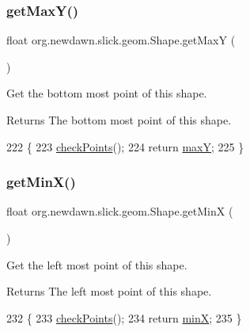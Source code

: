 \subsubsection{\texorpdfstring{get\+Max\+Y()}{getMaxY()}}
{\footnotesize\ttfamily float org.\+newdawn.\+slick.\+geom.\+Shape.\+get\+MaxY (\begin{DoxyParamCaption}{ }\end{DoxyParamCaption})\hspace{0.3cm}{\ttfamily [inline]}}

Get the bottom most point of this shape.

\begin{DoxyReturn}{Returns}
The bottom most point of this shape. 
\end{DoxyReturn}

\begin{DoxyCode}
222                            \{
223         \mbox{\hyperlink{classorg_1_1newdawn_1_1slick_1_1geom_1_1_shape_a84293802d05e8666a441720bfc12745d}{checkPoints}}();
224         \textcolor{keywordflow}{return} \mbox{\hyperlink{classorg_1_1newdawn_1_1slick_1_1geom_1_1_shape_aaacbabfb1b7d0653f59658d92ded1c2b}{maxY}};
225     \}
\end{DoxyCode}
\mbox{\label{classorg_1_1newdawn_1_1slick_1_1geom_1_1_shape_a7084b3e9c59db526281ce336b92cceac}} 
\subsubsection{\texorpdfstring{get\+Min\+X()}{getMinX()}}
{\footnotesize\ttfamily float org.\+newdawn.\+slick.\+geom.\+Shape.\+get\+MinX (\begin{DoxyParamCaption}{ }\end{DoxyParamCaption})\hspace{0.3cm}{\ttfamily [inline]}}

Get the left most point of this shape.

\begin{DoxyReturn}{Returns}
The left most point of this shape. 
\end{DoxyReturn}

\begin{DoxyCode}
232                            \{
233         \mbox{\hyperlink{classorg_1_1newdawn_1_1slick_1_1geom_1_1_shape_a84293802d05e8666a441720bfc12745d}{checkPoints}}();
234         \textcolor{keywordflow}{return} \mbox{\hyperlink{classorg_1_1newdawn_1_1slick_1_1geom_1_1_shape_a5bd07629e85d4a15fc03e3d60edb7c03}{minX}};
235     \}
\end{DoxyCode}
\mbox{\label{classorg_1_1newdawn_1_1slick_1_1geom_1_1_shape_a09c14deb0a506790962cd8cd25e67091}} 

